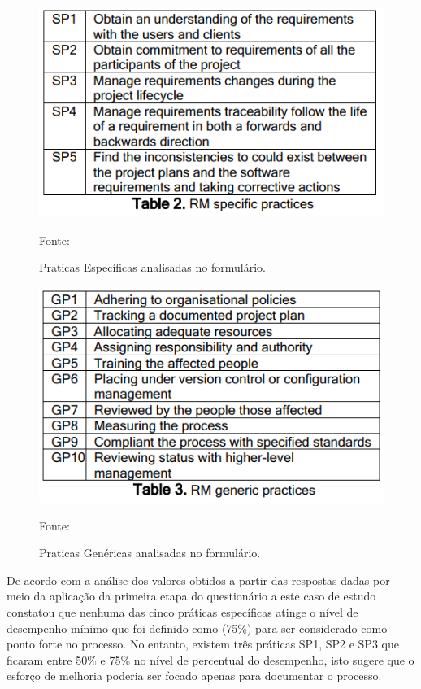 \newpage
\begin{figure}[!htb]
\centering
\label{fig01}
\includegraphics[keepaspectratio=true,scale=0.6]{figuras/praticas_especificas_status_projeto.png}
\caption{Praticas Específicas analisadas no formulário.}
{Fonte: \cite{cuevas2004assessment}}
\end{figure}
\begin{figure}[!htb]
\centering
\label{fig01}
\includegraphics[keepaspectratio=true,scale=0.6]{figuras/Praticas_genericas_status_projeto.png}
\caption{Praticas Genéricas analisadas no formulário.}
{Fonte: \cite{cuevas2004assessment}}
\end{figure}
\newpage

De acordo com \cite{cuevas2004assessment} a análise dos valores obtidos a partir das
respostas dadas por meio da aplicação da primeira etapa do questionário a este caso de estudo constatou que nenhuma das cinco práticas específicas atinge o
nível de desempenho mínimo que foi definido como (75\%) para ser considerado como ponto forte no processo.
No entanto, existem três práticas SP1, SP2 e
SP3 que ficaram entre 50\% e 75\% no nível de percentual do desempenho, isto sugere que o esforço de melhoria poderia ser focado apenas para documentar o processo.

